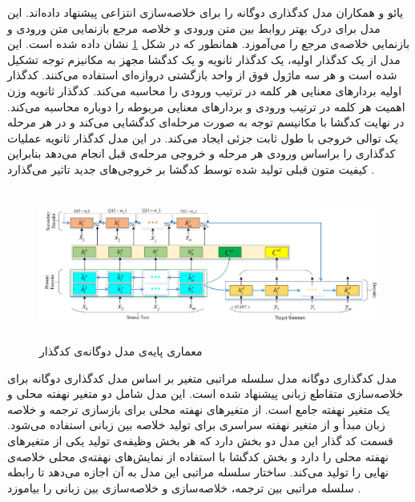 یائو
و همکاران مدل کدگذاری دوگانه را برای خلاصه‌سازی انتزاعی پیشنهاد داده‌اند. این مدل برای درک بهتر روابط بین متن ورودی و خلاصه مرجع بازنمایی متن ورودی و بازنمایی خلاصه‌ی مرجع را می‌آموزد. همانطور که در شکل \ref{fig:dual_encoder} نشان داده شده است.
این مدل از یک کدگذار اولیه، یک کدگذار ثانویه و یک کدگشا مجهز به مکانیزم توجه تشکیل شده است و هر سه ماژول فوق از واحد بازگشتی دروازه‌ای
استفاده می‌کنند. 
کدگذار اولیه بردارهای معنایی هر کلمه در ترتیب ورودی را محاسبه می‌کند. کدگذار ثانویه وزن اهمیت هر کلمه در ترتیب ورودی و بردارهای معنایی مربوطه را دوباره محاسبه می‌کند. در نهایت کدگشا با مکانیسم توجه به صورت مرحله‌ای کدگشایی می‌کند و در هر مرحله یک توالی خروجی با طول ثابت جزئی ایجاد می‌کند. در این مدل کدگذار ثانویه عملیات کدگذاری را براساس ورودی هر مرحله و خروجی مرحله‌ی قبل انجام می‌دهد بنابراین کیفیت متون قبلی تولید شده توسط کدگشا بر خروجی‌های جدید تاثیر می‌گذارد
 \cite{yao2018dual}.



\begin{figure}[!h]
	\begin{center}
		\includegraphics[height=5cm]{dualـencoder.png}
	\end{center}
	\caption{معماری پایه‌‌ی مدل دوگانه‌ی کدگذار 	 \cite{yao2018dual}}
	\label{fig:dual_encoder}
	\medskip
	\small
\end{figure}


مدل کدگذاری دوگانه مدل سلسله مراتبی متغیر بر اساس مدل کدگذاری دوگانه برای خلاصه‌سازی متقاطع زبانی
پیشنهاد شده است. این مدل شامل دو متغیر نهفته محلی و یک متغیر نهفته جامع است. از متغیرهای نهفته محلی برای بازسازی ترجمه و خلاصه زبان مبدأ و از متغیر نهفته سراسری برای تولید خلاصه بین زبانی استفاده می‌شود. قسمت کد گذار این مدل دو بخش دارد که هر بخش وظیفه‌ی تولید یکی از متغیرهای نهفته محلی را دارد و بخش کدگشا با استفاده از نمایش‌های نهفته‌ی محلی خلاصه‌ی نهایی را تولید می‌کند.
ساختار سلسله مراتبی این مدل به آن اجازه می‌دهد تا رابطه سلسله مراتبی بین ترجمه، خلاصه‌سازی و خلاصه‌سازی بین زبانی را بیاموزد \cite{variational}.

